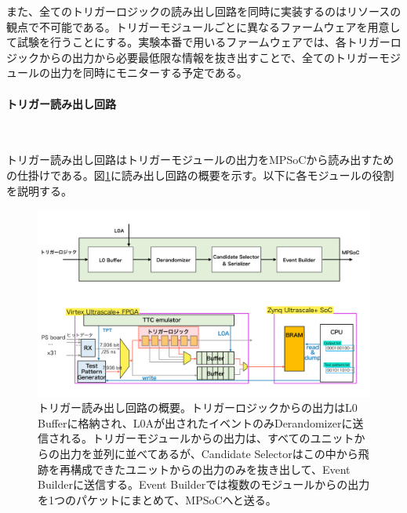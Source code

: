 また、全てのトリガーロジックの読み出し回路を同時に実装するのはリソースの観点で不可能である。トリガーモジュールごとに異なるファームウェアを用意して試験を行うことにする。実験本番で用いるファームウェアでは、各トリガーロジックからの出力から必要最低限な情報を抜き出すことで、全てのトリガーモジュールの出力を同時にモニターする予定である。

\paragraph{トリガー読み出し回路}　　
\par
トリガー読み出し回路はトリガーモジュールの出力をMPSoCから読み出すための仕掛けである。図\ref{Readout_Circuite}に読み出し回路の概要を示す。以下に各モジュールの役割を説明する。

\begin{figure} 
\centering
\includegraphics[width=16cm]{fig/Test/Readout_Circuite.pdf}
\caption[トリガー読み出し回路の概要]{トリガー読み出し回路の概要。トリガーロジックからの出力はL0 Bufferに格納され、L0Aが出されたイベントのみDerandomizerに送信される。トリガーモジュールからの出力は、すべてのユニットからの出力を並列に並べてあるが、Candidate Selectorはこの中から飛跡を再構成できたユニットからの出力のみを抜き出して、Event Builderに送信する。Event Builderでは複数のモジュールからの出力を1つのパケットにまとめて、MPSoCへと送る。}
\label{Readout_Circuite}
\end{figure}

